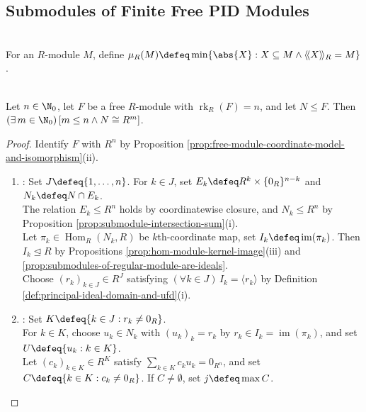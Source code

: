 \subsection{Submodules of Finite Free PID Modules}

\begin{definition} \label{def:minimum-number-module-generators} \\
For an $R$-module $M$, define $\mu_R(M)\defeq\min\{\abs{X}:X\subseteq M\land\langle\!\langle X\rangle\!\rangle_R=M\}$.
\end{definition}

\begin{theorem} \label{thm:submodule-of-finite-free-pid-is-free} \\
Let $n\in\N_0$, let $F$ be a free $R$-module with $\operatorname{rk}_R(F)=n$, and let $N\leq F$. Then $(\exists\,m\in\N_0)\,[m\leq n\land N\cong R^m]$.
\begin{proof}
Identify $F$ with $R^n$ by Proposition \ref{prop:free-module-coordinate-model-and-isomorphism}(ii).
\begin{enumerate}[label=(\roman*)]
\setlength{\itemsep}{0pt}
\item {}: Set $J\defeq\{1,\ldots,n\}$. For $k\in J$, set $E_k\defeq R^k\times\{0_R\}^{n-k}$ and $N_k\defeq N\cap E_k$.\\
The relation $E_k\leq R^n$ holds by coordinatewise closure, and $N_k\leq R^n$ by Proposition \ref{prop:submodule-intersection-sum}(i).\\
Let $\pi_k\in\operatorname{Hom}_R(N_k,R)$ be $k$th-coordinate map, set $I_k\defeq\operatorname{im}(\pi_k)$. Then $I_k\trianglelefteq R$ by Propositions \ref{prop:hom-module-kernel-image}(iii) and \ref{prop:submodules-of-regular-module-are-ideals}.\\
Choose $(r_k)_{k\in J}\in R^J$ satisfying $(\forall k\in J)\,I_k=\langle r_k\rangle$ by Definition \ref{def:principal-ideal-domain-and-ufd}(i).
\item {}: Set $K\defeq\{k\in J:r_k\neq0_R\}$.\\
For $k\in K$, choose $u_k\in N_k$ with $(u_k)_k=r_k$ by $r_k\in I_k=\operatorname{im}(\pi_k)$, and set $U\defeq\{u_k:k\in K\}$.\\
Let $(c_k)_{k\in K}\in R^K$ satisfy $\sum\limits_{k\in K}c_ku_k=0_{R^n}$, and set $C\defeq\{k\in K:c_k\neq0_R\}$. If $C\neq\emptyset$, set $j\defeq\max C$.\\

\end{enumerate}
\end{proof}
\end{theorem}
